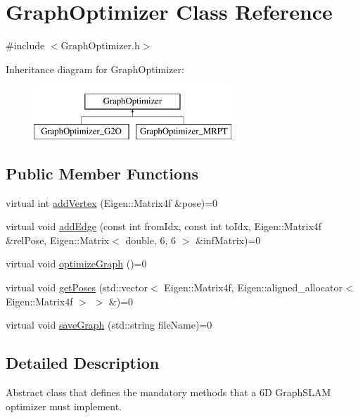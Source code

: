 \hypertarget{class_graph_optimizer}{
\section{GraphOptimizer Class Reference}
\label{class_graph_optimizer}
}


{\ttfamily \#include $<$GraphOptimizer.h$>$}

Inheritance diagram for GraphOptimizer:\begin{figure}[H]
\begin{center}
\leavevmode
\includegraphics[height=2.000000cm]{class_graph_optimizer}
\end{center}
\end{figure}
\subsection*{Public Member Functions}
\begin{DoxyCompactItemize}
\item 
virtual int \hyperlink{class_graph_optimizer_a2acd85307e0c0a006a2360f9d7e29bce}{addVertex} (Eigen::Matrix4f \&pose)=0
\item 
virtual void \hyperlink{class_graph_optimizer_a7bf9e4c2d3376bf8af5b15c86398950e}{addEdge} (const int fromIdx, const int toIdx, Eigen::Matrix4f \&relPose, Eigen::Matrix$<$ double, 6, 6 $>$ \&infMatrix)=0
\item 
virtual void \hyperlink{class_graph_optimizer_ad1e8ac7c0aa9c90f3035c1d29036eedb}{optimizeGraph} ()=0
\item 
virtual void \hyperlink{class_graph_optimizer_a914f6c37de8dc6437122b3f563cce9a5}{getPoses} (std::vector$<$ Eigen::Matrix4f, Eigen::aligned\_\-allocator$<$ Eigen::Matrix4f $>$ $>$ \&)=0
\item 
virtual void \hyperlink{class_graph_optimizer_a303a1e4e96fa44433ef48aa4051fab32}{saveGraph} (std::string fileName)=0
\end{DoxyCompactItemize}


\subsection{Detailed Description}
Abstract class that defines the mandatory methods that a 6D GraphSLAM optimizer must implement. 

